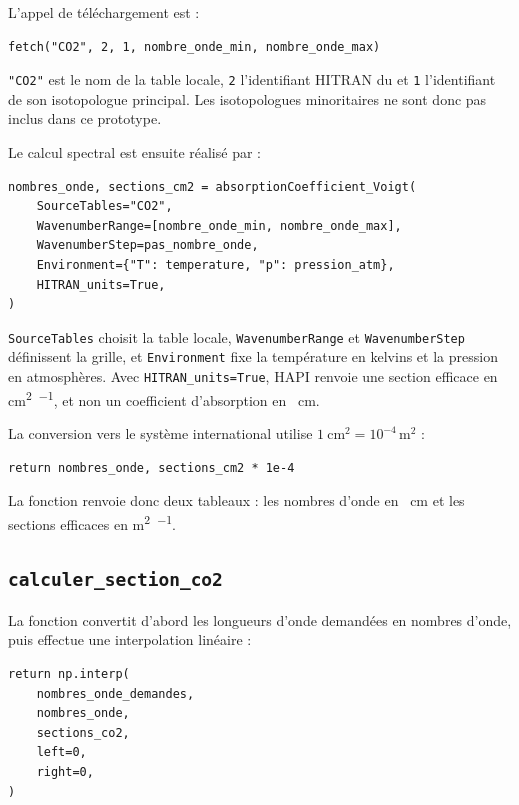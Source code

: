\documentclass[11pt,a4paper]{article}
\newcommand{\code}[1]{\texttt{#1}}
\begin{document}
L'appel de téléchargement est :

\begin{lstlisting}
fetch("CO2", 2, 1, nombre_onde_min, nombre_onde_max)
\end{lstlisting}

\code{"CO2"} est le nom de la table locale, \code{2} l'identifiant HITRAN du
 et \code{1} l'identifiant de son isotopologue principal. Les
isotopologues minoritaires ne sont donc pas inclus dans ce prototype.

Le calcul spectral est ensuite réalisé par :

\begin{lstlisting}
nombres_onde, sections_cm2 = absorptionCoefficient_Voigt(
    SourceTables="CO2",
    WavenumberRange=[nombre_onde_min, nombre_onde_max],
    WavenumberStep=pas_nombre_onde,
    Environment={"T": temperature, "p": pression_atm},
    HITRAN_units=True,
)
\end{lstlisting}

\code{SourceTables} choisit la table locale, \code{WavenumberRange} et
\code{WavenumberStep} définissent la grille, et \code{Environment} fixe la
température en kelvins et la pression en atmosphères. Avec
\code{HITRAN\_units=True}, HAPI renvoie une section efficace en
\si{\centi\metre\squared\per\molecule}, et non un coefficient d'absorption en
\si{\per\centi\metre}.

La conversion vers le système international utilise
$\SI{1}{\centi\metre\squared}=10^{-4}\,\si{\metre\squared}$ :

\begin{lstlisting}
return nombres_onde, sections_cm2 * 1e-4
\end{lstlisting}

La fonction renvoie donc deux tableaux : les nombres d'onde en
\si{\per\centi\metre} et les sections efficaces en
\si{\metre\squared\per\molecule}.

\subsection{\code{calculer\_section\_co2}}

La fonction convertit d'abord les longueurs d'onde demandées en nombres
d'onde, puis effectue une interpolation linéaire :

\begin{lstlisting}
return np.interp(
    nombres_onde_demandes,
    nombres_onde,
    sections_co2,
    left=0,
    right=0,
)
\end{lstlisting}
\end{document}
